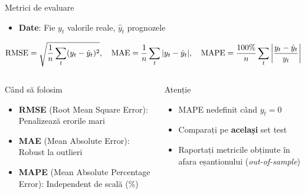 \documentclass[9pt, aspectratio=169, t]{beamer}
\begin{document}
\begin{frame}{Metrici de evaluare}
    \begin{defn}
        \begin{itemize}\setlength{\itemsep}{0pt}
            \item \textbf{Date}: Fie $y_t$ valorile reale, $\hat{y}_t$ prognozele
        \end{itemize}
        \vspace{-0.2cm}
        \begin{align*}
            \text{RMSE} = \sqrt{\frac{1}{n}\sum_{t}(y_t - \hat{y}_t)^2}, \quad
            \text{MAE} = \frac{1}{n}\sum_{t}|y_t - \hat{y}_t|, \quad
            \text{MAPE} = \frac{100\%}{n}\sum_{t}\left|\frac{y_t - \hat{y}_t}{y_t}\right|
        \end{align*}
    \end{defn}

    \begin{columns}[T]
        \begin{exampleblock}{Când să folosim}
            \begin{itemize}\setlength{\itemsep}{0pt}
                \item \textbf{RMSE} (Root Mean Square Error): Penalizează erorile mari
                \item \textbf{MAE} (Mean Absolute Error): Robust la outlieri
                \item \textbf{MAPE} (Mean Absolute Percentage Error): Independent de scală (\%)
            \end{itemize}
        \end{exampleblock}

        \begin{alertblock}{Atenție}
            \begin{itemize}\setlength{\itemsep}{0pt}
                \item MAPE nedefinit când $y_t = 0$
                \item Comparați pe \textbf{același} set test
                \item Raportați metricile obținute în afara eșantionului (\emph{out-of-sample})
            \end{itemize}
        \end{alertblock}
    \end{columns}
\end{frame}
\end{document}
